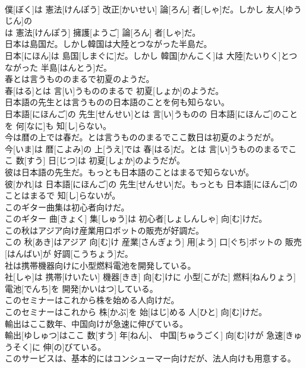 \documentclass[8pt]{extreport}
\begin{document}
\begin{CJK}{UTF8}{min}
\\	僕[ぼく]は 憲法[けんぽう] 改正[かいせい] 論[ろん] 者[しゃ]だ。しかし 友人[ゆうじん]の 
\\	は 憲法[けんぽう] 擁護[ようご] 論[ろん] 者[しゃ]だ。
\\	日本は島国だ。しかし韓国は大陸とつながった半島だ。	
\\	日本[にほん]は 島国[しまぐに]だ。しかし 韓国[かんこく]は 大陸[たいりく]とつながった 半島[はんとう]だ。
\\	春とは言うもののまるで初夏のようだ。	
\\	春[はる]とは 言[い]うもののまるで 初夏[しょか]のようだ。
\\	日本語の先生とは言うものの日本語のことを何も知らない。	
\\	日本語[にほんご]の 先生[せんせい]とは 言[い]うものの 日本語[にほんご]のことを 何[なに]も 知[し]らない。
\\	今は暦の上では春だ。とは言うもののまるでここ数日は初夏のようだが。	
\\	今[いま]は 暦[こよみ]の 上[うえ]では 春[はる]だ。とは 言[い]うもののまるでここ 数[すう] 日[じつ]は 初夏[しょか]のようだが。
\\	彼は日本語の先生だ。もっとも日本語のことはまるで知らないが。	
\\	彼[かれ]は 日本語[にほんご]の 先生[せんせい]だ。もっとも 日本語[にほんご]のことはまるで 知[し]らないが。
\\	このギター曲集は初心者向けだ。	
\\	このギター 曲[きょく] 集[しゅう]は 初心者[しょしんしゃ] 向[む]けだ。
\\	この秋はアジア向け産業用口ボットの販売が好調だ。	
\\	この 秋[あき]はアジア 向[む]け 産業[さんぎょう] 用[よう] 口[ぐち]ボットの 販売[はんばい]が 好調[こうちょう]だ。
\\	社は携帯機器向けに小型燃料電池を開発している。	
\\	社[しゃ]は 携帯[けいたい] 機器[きき] 向[む]けに 小型[こがた] 燃料[ねんりょう] 電池[でんち]を 開発[かいはつ]している。
\\	このセミナーはこれから株を始める人向けだ。	
\\	このセミナーはこれから 株[かぶ]を 始[はじ]める 人[ひと] 向[む]けだ。
\\	輸出はここ数年、中国向けが急速に伸びている。	
\\	輸出[ゆしゅつ]はここ 数[すう] 年[ねん]、 中国[ちゅうごく] 向[む]けが 急速[きゅうそく]に 伸[の]びている。
\\	このサービスは、基本的にはコンシューマー向けだが、法人向けも用意する。	

\end{CJK}
\end{document}
